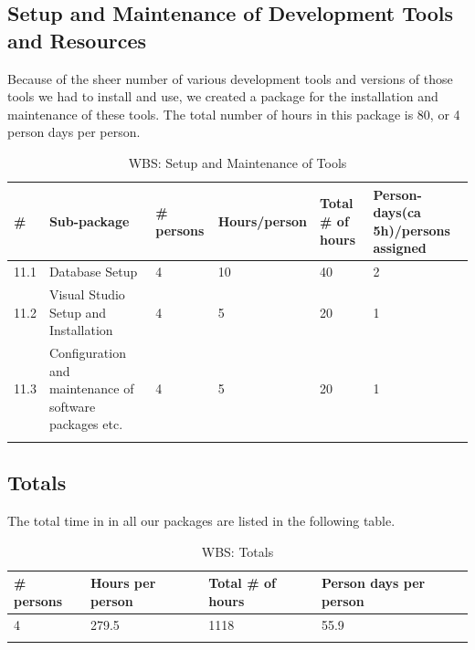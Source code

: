 \subsection{Setup and Maintenance of Development Tools and Resources}
Because of the sheer number of various development tools and versions of those tools we had to install and use, we created a package for the installation and maintenance of these tools. The total number of hours in this package is 80, or 4 person days per person.
\begin{longtable}{|p{0.7cm}|p{3cm}|p{1.8cm}|p{2.5cm}|p{2cm}|p{2.8cm}|}
\hline
\# & Sub-package & \# persons & Hours/person & Total \# of hours & Person-days(ca 5h)/persons assigned\\ 
\hline
11.1 & Database Setup & 4 & 10 & 40 & 2\\ 
\hline
11.2 & Visual Studio Setup and Installation & 4 & 5 & 20 & 1\\ 
\hline
11.3 & Configuration and maintenance of software packages etc. & 4 & 5 & 20 & 1\\ 
\hline
\caption{WBS: Setup and Maintenance of Tools}
\end{longtable}

\subsection{Totals}
The total time in in all our packages are listed in the following table.
\begin{longtable}{|p{2cm}|p{3cm}|p{3cm}|p{4.5cm}|}
\hline
\# persons & Hours per person & Total \# of hours & Person days per person\\ 
\hline
4 & 279.5 & 1118 & 55.9\\ 
\hline
\caption{WBS: Totals}
\end{longtable}

